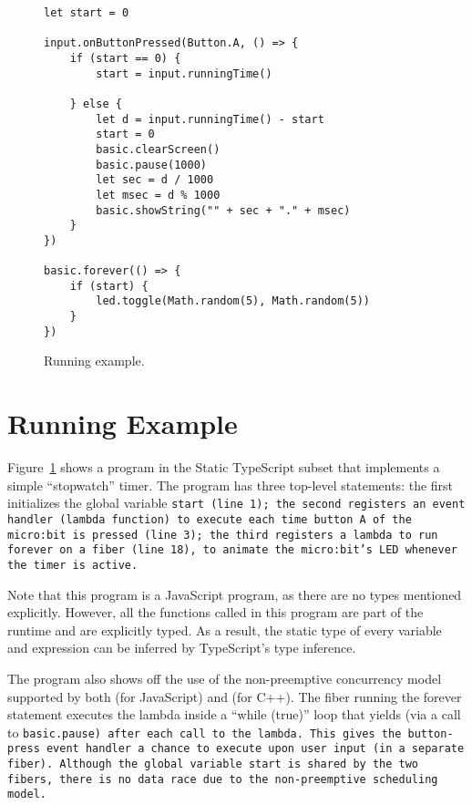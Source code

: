 
\begin{figure}
\begin{lstlisting}
let start = 0

input.onButtonPressed(Button.A, () => {
    if (start == 0) {
        start = input.runningTime()

    } else {
        let d = input.runningTime() - start
        start = 0
        basic.clearScreen()
        basic.pause(1000)
        let sec = d / 1000
        let msec = d % 1000
        basic.showString("" + sec + "." + msec)
    }
})

basic.forever(() => {
    if (start) {
        led.toggle(Math.random(5), Math.random(5))
    }
})
\end{lstlisting}
\caption{\label{fig:running}Running example.}
\end{figure}

\section{Running Example}

Figure~\ref{fig:running} shows a program in the Static
TypeScript subset that implements a simple ``stopwatch'' timer. 
The program has three top-level statements:
the first initializes the global variable \tt{start} (line 1); the
second registers an event handler (lambda function) to execute
each time button A of the micro:bit is pressed (line 3); the
third registers a lambda to run forever on a fiber (line 18),
to animate the micro:bit's LED whenever the timer is active. 

Note that this program is a JavaScript program, as there are no 
types mentioned explicitly. However, all the functions called in
this program are part of the runtime and are explicitly
typed.  As a result, the static type of every variable and expression
can be inferred by TypeScript's type inference.

The program also shows off the use of the non-preemptive concurrency
model supported by both \MC (for JavaScript) and \CO (for C++). 
The fiber running the forever statement executes the lambda inside a ``while (true)'' 
loop that yields (via a call to \tt{basic.pause}) after each call to the lambda.
This gives the button-press event handler a chance to execute
upon user input (in a separate fiber). Although the global variable \tt{start} is 
shared by the two fibers, there is no data race due to the non-preemptive 
scheduling model. 



